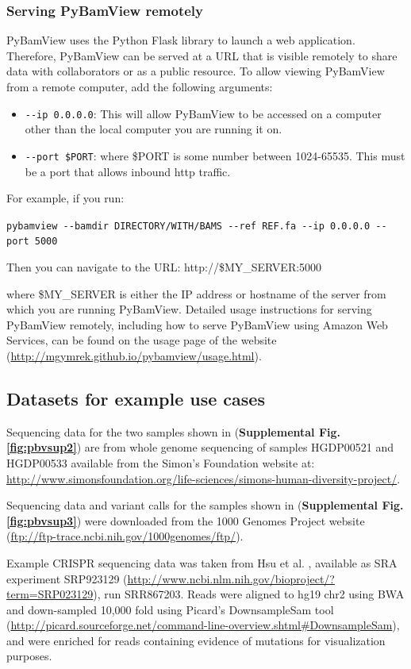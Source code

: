 \subsubsection{Serving PyBamView remotely}
PyBamView uses the Python Flask library to launch a web application. Therefore, PyBamView can be served at a URL that is visible remotely to share data with collaborators or as a public resource. To allow viewing PyBamView from a remote computer, add the following arguments:
\begin{itemize}
\item \texttt{-{}-ip 0.0.0.0}: This will allow PyBamView to be accessed on a computer other than the local computer you are running it on.
\item \texttt{-{}-port \$PORT}: where \$PORT is some number between 1024-65535. This must be a port that allows inbound http traffic.
\end{itemize}

For example, if you run:

\texttt{pybamview -{}-bamdir DIRECTORY/WITH/BAMS -{}-ref REF.fa -{}-ip 0.0.0.0 -{}-port 5000}

Then you can navigate to the URL: http://\$MY\_SERVER:5000

where \$MY\_SERVER is either the IP address or hostname of the server from which you are running PyBamView. Detailed usage instructions for serving PyBamView remotely, including how to serve PyBamView using Amazon Web Services, can be found on the usage page of the website (\url{http://mgymrek.github.io/pybamview/usage.html}).

\subsection{Datasets for example use cases}
Sequencing data for the two samples shown in (\textbf{Supplemental Fig. \ref{fig:pbvsup2}}) are from whole genome sequencing of samples HGDP00521 and HGDP00533 available from the Simon's Foundation website at: 
\\
\url{http://www.simonsfoundation.org/life-sciences/simons-human-diversity-project/}.

Sequencing data and variant calls for the samples shown in (\textbf{Supplemental Fig. \ref{fig:pbvsup3}}) were downloaded from the 1000 Genomes Project website (\url{ftp://ftp-trace.ncbi.nih.gov/1000genomes/ftp/}). 

Example CRISPR sequencing data was taken from Hsu et al. \cite{HsuScottWeinsteinEtAl2013}, available as SRA experiment SRP923129 (\url{http://www.ncbi.nlm.nih.gov/bioproject/?term=SRP023129}), run SRR867203. Reads were aligned to hg19 chr2 using BWA \cite{LiDurbin2009} and down-sampled 10,000 fold using Picard's DownsampleSam tool (\url{http://picard.sourceforge.net/command-line-overview.shtml#DownsampleSam}), and were enriched for reads containing evidence of mutations for visualization purposes.

